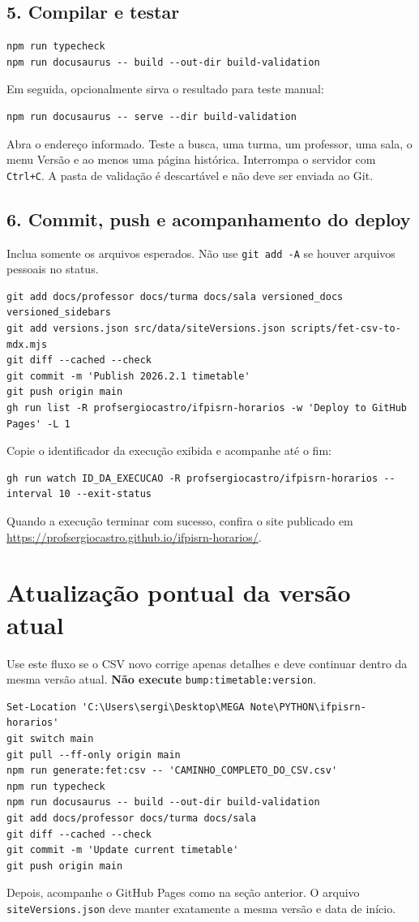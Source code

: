 \documentclass[11pt,a4paper]{article}
\begin{document}
\subsection{5. Compilar e testar}
\begin{lstlisting}
npm run typecheck
npm run docusaurus -- build --out-dir build-validation
\end{lstlisting}
Em seguida, opcionalmente sirva o resultado para teste manual:
\begin{lstlisting}
npm run docusaurus -- serve --dir build-validation
\end{lstlisting}
Abra o endereço informado. Teste a busca, uma turma, um professor, uma sala, o menu Versão e ao menos uma página histórica. Interrompa o servidor com \texttt{Ctrl+C}. A pasta de validação é descartável e não deve ser enviada ao Git.

\subsection{6. Commit, push e acompanhamento do deploy}
Inclua somente os arquivos esperados. Não use \texttt{git add -A} se houver arquivos pessoais no status.
\begin{lstlisting}
git add docs/professor docs/turma docs/sala versioned_docs versioned_sidebars
git add versions.json src/data/siteVersions.json scripts/fet-csv-to-mdx.mjs
git diff --cached --check
git commit -m 'Publish 2026.2.1 timetable'
git push origin main
gh run list -R profsergiocastro/ifpisrn-horarios -w 'Deploy to GitHub Pages' -L 1
\end{lstlisting}
Copie o identificador da execução exibida e acompanhe até o fim:
\begin{lstlisting}
gh run watch ID_DA_EXECUCAO -R profsergiocastro/ifpisrn-horarios --interval 10 --exit-status
\end{lstlisting}
Quando a execução terminar com sucesso, confira o site publicado em \url{https://profsergiocastro.github.io/ifpisrn-horarios/}.

\section{Atualização pontual da versão atual}
Use este fluxo se o CSV novo corrige apenas detalhes e deve continuar dentro da mesma versão atual. \textbf{Não execute} \texttt{bump:timetable:version}.
\begin{lstlisting}
Set-Location 'C:\Users\sergi\Desktop\MEGA Note\PYTHON\ifpisrn-horarios'
git switch main
git pull --ff-only origin main
npm run generate:fet:csv -- 'CAMINHO_COMPLETO_DO_CSV.csv'
npm run typecheck
npm run docusaurus -- build --out-dir build-validation
git add docs/professor docs/turma docs/sala
git diff --cached --check
git commit -m 'Update current timetable'
git push origin main
\end{lstlisting}
Depois, acompanhe o GitHub Pages como na seção anterior. O arquivo \texttt{siteVersions.json} deve manter exatamente a mesma versão e data de início.
\end{document}
